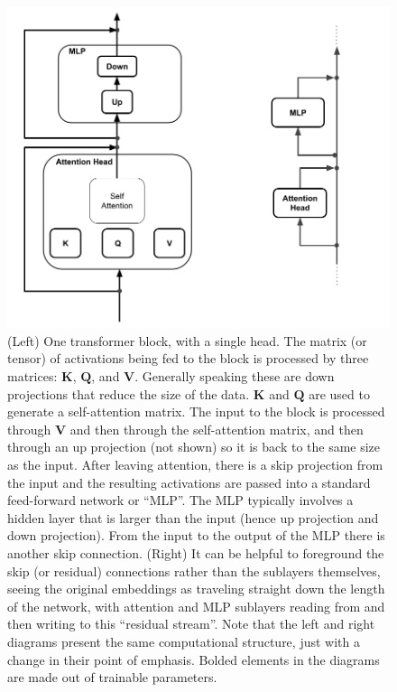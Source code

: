 \begin{figure}[ht]
\centering
\includegraphics[scale=.3]{./images/transformerBlockResidualStream.png}
\caption[Jeff Yoshimi with consultation from Tim Meyer.]{(Left) One transformer
block, with a single head. The matrix  (or tensor) of activations being fed to
the block is processed by three matrices: $\textbf{K}$, $\textbf{Q}$, and
$\textbf{V}$.  Generally speaking these are down projections that reduce the
size of the data.  $\textbf{K}$ and $\textbf{Q}$ are used to generate a
self-attention matrix. The input to the block is processed through $\textbf{V}$
and then through the self-attention matrix, and then through an up projection
(not shown) so it is back to the same size as the input. After leaving
attention, there is a skip projection from the input and the resulting
activations are passed into a standard feed-forward network or ``MLP''. The MLP
typically involves a hidden layer that is larger than the input (hence up
projection and down projection). From the input to the output of the MLP there
is another skip connection. (Right) It can be helpful to foreground the skip
(or residual) connections rather than the sublayers themselves, seeing the
original embeddings as traveling straight down the length of the network, with
attention and MLP sublayers reading from and then writing to this ``residual
stream''. Note that the left and right diagrams present the same computational
structure, just with a change in their point of emphasis. Bolded elements in
the diagrams are made out of trainable parameters.}
\label{transformerBlockSimple}
\end{figure}

